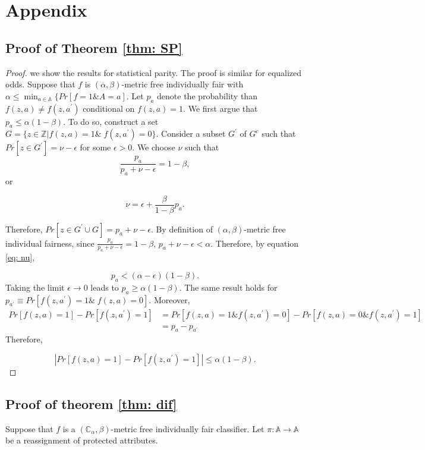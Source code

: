 \documentclass{article}
\begin{document}
\section{Appendix}

\subsection{Proof of Theorem \ref{thm: SP}}
\begin{proof}
we show the results for statistical parity. The proof is similar for equalized odds. Suppose that $f$ is $(\alpha,\beta)$-metric free individually fair with $\alpha \leq \min_{a\in \mathbb{A}}\{Pr[f=1 \& A=a]$. Let $p_{a}$ denote the probability than $f(z, a)\neq f(z, a^{'})$ conditional on  $f(z,a)=1$. We first argue that $p_{a} \leq \alpha(1-\beta)$. To do so, construct a set $G=\{z\in \mathbb{Z}| f(z,a)= 1 \& \; f(z,a^{'})=0\}$. Consider a subset $G^{'}$ of $G^{c}$ such that $Pr[z\in G^{'}]=\nu-\epsilon$ for some $\epsilon>0$. We choose $\nu$ such that $$\frac{p_{a}}{p_{a} + \nu -\epsilon} = 1-\beta, $$
or

\begin{equation}
\label{eq: nu}
\nu = \epsilon + \frac{\beta}{1-\beta}p_{a}.    
\end{equation}

Therefore, $Pr[z\in G^{'}\cup G]=p_{a} + \nu - \epsilon$. By definition of $(\alpha, \beta)$-metric free individual fairness, since $ \frac{p_{a}}{p_{a} + \nu -\epsilon} = 1-\beta$, $p_{a} + \nu -\epsilon < \alpha$. Therefore, by equation \eqref{eq: nu},

$$  p_{a} < (\alpha - \epsilon)(1-\beta).$$ Taking the limit $\epsilon \rightarrow 0$ leads to $p_{a}\geq \alpha(1-\beta)$. The same result holds for $p_{a^{'}}\equiv Pr[f(z, a^{'})=1 \& \; f(z,a)=0]$. Moreover,
\begin{equation}
    \begin{split}
        Pr[f(z, a)=1] - Pr[f(z, a^{'})=1] & =  Pr[f(z, a)=1 \& f(z, a^{'})=0] - Pr[f(z, a)=0 \& f(z, a^{'})=1] \\
         & = p_{a} - p_{a^{'}}
    \end{split}
\end{equation}
Therefore, 

$$|Pr[f(z, a)=1] - Pr[f(z, a^{'})=1]| \leq \alpha(1-\beta). $$
\end{proof}

\subsection{Proof of theorem \ref{thm: dif}}
Suppose that $f$ is a $(\mathbb{C}_{\alpha}, \beta)$-metric free individually fair classifier. Let $\pi: \mathbb{A} \rightarrow \mathbb{A}$ be a reassignment of protected attributes.
\end{document}
